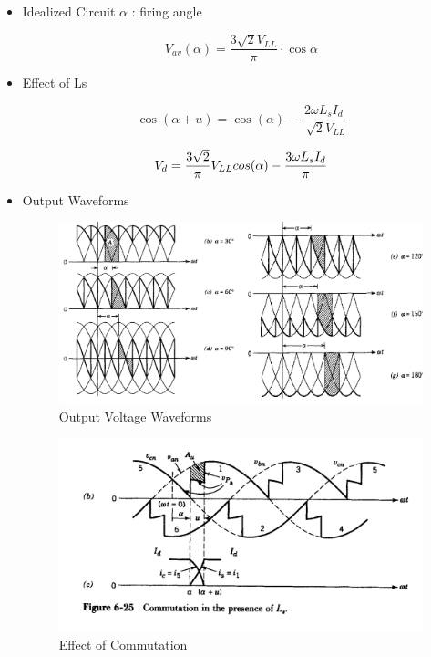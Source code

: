 \documentclass[twocolumn, ]{article}
\begin{document}
\begin{itemize}
\item {Idealized Circuit} $\alpha$ : firing angle

\begin{equation*}
	V_{av}(\alpha)=\frac{3 \sqrt{2} V_{LL}}{\pi } \cdot \cos{\alpha}
\end{equation*}

\item {Effect of Ls}

\begin{equation*}
	\cos(\alpha + u)=\cos(\alpha)-\dfrac{2\omega L_{s} I_{d}}{\sqrt[]{2}V_{LL}}
\end{equation*}

\begin{equation*}
	V_d = \frac{3\sqrt{2}}{\pi} V_{LL} cos(\alpha) - \dfrac{3\omega L_s I_d}{\pi} \\
\end{equation*}

\item {Output Waveforms}
\begin{figure}[!ht]
	\includegraphics[scale=0.45]{3phwave1.png}
	\caption{Output Voltage Waveforms}
\end{figure}

\begin{figure}[!ht]
	\includegraphics[scale=0.3]{comm.png}
	\caption{Effect of Commutation}
\end{figure}


\end{itemize}
\end{document}
